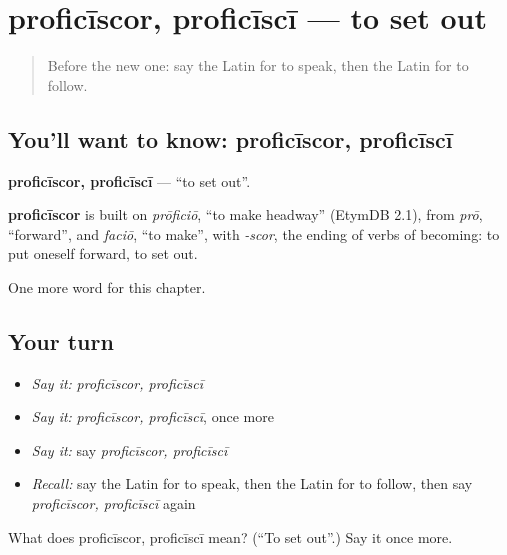 \section[proficīscor, proficīscī]{proficīscor, proficīscī — to set out}

\label{lesson:LA-C235-proficiscor}



\begin{quote}
Before the new one: say the Latin for to speak, then the Latin for to follow.
\end{quote}

\subsection*{You'll want to know: proficīscor, proficīscī}
\textbf{proficīscor, proficīscī} — \textquotedblleft{}to set out\textquotedblright{}.

\begin{cousinweb}
\textbf{proficīscor} is built on \emph{prōficiō}, \textquotedblleft{}to make headway\textquotedblright{} (EtymDB 2.1), from \emph{prō}, \textquotedblleft{}forward\textquotedblright{}, and \emph{faciō}, \textquotedblleft{}to make\textquotedblright{}, with \emph{-scor}, the ending of verbs of becoming: to put oneself forward, to set out.
\end{cousinweb}

\begin{grammarlens}[title={What you've built}]
One more word for this chapter.
\end{grammarlens}

\subsection*{Your turn}
\begin{itemize}
\raggedright
  \item \emph{Say it:} \emph{proficīscor, proficīscī}
  \item \emph{Say it:} \emph{proficīscor, proficīscī}, once more
  \item \emph{Say it:} say \emph{proficīscor, proficīscī}
  \item \emph{Recall:} say the Latin for to speak, then the Latin for to follow, then say \emph{proficīscor, proficīscī} again
\end{itemize}

\begin{tcolorbox}[breakable,colback=teal!4,colframe=teal!35!black,title={Before you move on}]
What does proficīscor, proficīscī mean? (\textquotedblleft{}To set out\textquotedblright{}.) Say it once more.
\end{tcolorbox}
